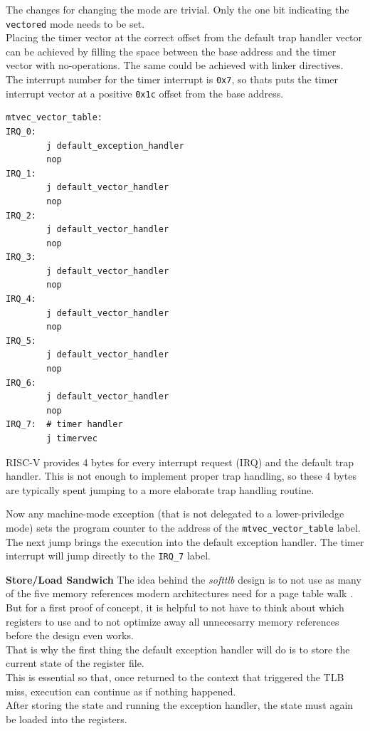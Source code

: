 The changes for changing the mode are trivial. Only the one bit indicating the \texttt{vectored} mode
needs to be set.\\
Placing the timer vector at the correct offset from the default trap handler vector can be achieved by
filling the space between the base address and the timer vector with no-operations. The same could be
achieved with linker directives.\\
The interrupt number for the timer interrupt is \texttt{0x7}, so thats puts the timer interrupt vector
at a positive \texttt{0x1c} offset from the base address.

\begin{lstlisting}[language={[RISC-V]Assembler},float=h!,
    label={lst:defaultTrapHandler}, caption={Vectored Trap Handler Routine}]
mtvec_vector_table:
IRQ_0:
        j default_exception_handler
        nop
IRQ_1:
        j default_vector_handler
        nop
IRQ_2:
        j default_vector_handler
        nop
IRQ_3:
        j default_vector_handler
        nop
IRQ_4:
        j default_vector_handler
        nop
IRQ_5:
        j default_vector_handler
        nop
IRQ_6:
        j default_vector_handler
        nop
IRQ_7:  # timer handler
        j timervec
\end{lstlisting}


RISC-V provides 4 bytes for every interrupt request (IRQ) and the default trap handler. This is not enough
to implement proper trap handling, so these 4 bytes are typically spent jumping to a more elaborate trap
handling routine.

Now any machine-mode exception (that is not delegated to a lower-priviledge mode) sets the program counter
to the address of the \texttt{mtvec\_vector\_table} label. The next jump brings the execution into
the default exception handler.
The timer interrupt will jump directly to the \texttt{IRQ\_7} label.

\textbf{Store/Load Sandwich} The idea behind the \textit{softtlb} design is to not use as many of the five
memory references modern architectures need for a page table walk \cite{intel5LevelPaging5Level2017}. But
for a first proof of concept, it is helpful to not have to think about which registers to use and to not optimize
away all unnecesarry memory references before the design even works.\\
That is why the first thing the default exception handler will do is to store the current state of the register
file.\\
This is essential so that, once returned to the context that triggered the TLB miss, execution can continue
as if nothing happened.\\
After storing the state and running the exception handler, the state must again be loaded into the registers.

